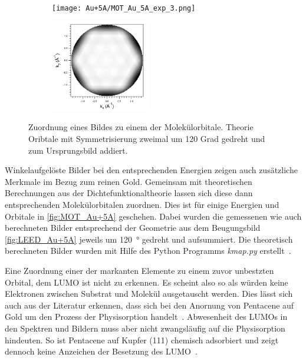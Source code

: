 \begin{figure}
\begin{subfigure}[t]{0.48\textwidth}
                \texttt{[image: Au+5A/MOT\_Au\_5A\_exp\_3.png]}
                \label{fig:MOT_Au+5A_exp_3}
            \end{subfigure}
            \begin{subfigure}[t]{0.48\textwidth}
                \centering
                \includegraphics[height=4cm]{Au+5A/HOMO2_all_CT}
                \label{fig:MOT_Au+5A_theo_3}
            \end{subfigure}
            \caption{Zuordnung eines Bildes zu einem der Molekülorbitale. Theorie Oribtale mit Symmetrisierung zweimal um 120 Grad gedreht und zum Ursprungsbild addiert.}
            \label{fig:MOT_Au+5A}
        \end{figure}
        Winkelaufgelöste Bilder bei den entsprechenden Energien zeigen auch zusätzliche Merkmale im Bezug zum reinen Gold.
        Gemeinsam mit theoretischen Berechnungen aus der Dichtefunktionaltheorie lassen sich diese dann entsprechenden Molekülorbitalen zuordnen.
        Dies ist für einige Energien und Orbitale in \autoref{fig:MOT_Au+5A} geschehen.
        Dabei wurden die gemessenen wie auch berechneten Bilder entsprechend der Geometrie aus dem Beugungsbild \autoref{fig:LEED_Au+5A} jeweils um \SI{120}{\degree} gedreht und aufsummiert.
        Die theoretisch berechneten Bilder wurden mit Hilfe des Python Programms \textit{kmap.py} erstellt~\cite{brandstetter_kmappy_2021}.

        Eine Zuordnung einer der markanten Elemente zu einem zuvor unbestzten Orbital, dem LUMO ist nicht zu erkennen.
        Es scheint also so als würden keine Elektronen zwischen Substrat und Molekül ausgetauscht werden. 
        Dies lässt sich auch aus der Literatur erkennen, dass sich bei den Anornung von Pentacene auf Gold um den Prozess der Physisorption handelt~\cite{5A_4}.
        Abwesenheit des LUMOs in den Spektren und Bildern muss aber nicht zwangsläufig auf die Physisorption hindeuten.
        So ist Pentacene auf Kupfer (111) chemisch adsorbiert und zeigt dennoch keine Anzeichen der Besetzung des LUMO~\cite{koch_adsorption-induced_2008}.

